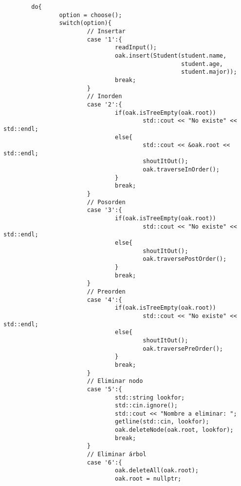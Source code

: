 \documentclass[11pt]{article}
\begin{document}
\begin{verbatim}
        do{
                option = choose();
                switch(option){
                        // Insertar
                        case '1':{
                                readInput();
                                oak.insert(Student(student.name,
                                                   student.age,
                                                   student.major));
                                break;
                        }
                        // Inorden
                        case '2':{
                                if(oak.isTreeEmpty(oak.root))
                                        std::cout << "No existe" << std::endl;
                                else{
                                        std::cout << &oak.root << std::endl;
                                        shoutItOut();
                                        oak.traverseInOrder();
                                }
                                break;
                        }
                        // Posorden
                        case '3':{
                                if(oak.isTreeEmpty(oak.root))
                                        std::cout << "No existe" << std::endl;
                                else{
                                        shoutItOut();
                                        oak.traversePostOrder();
                                }
                                break;
                        }
                        // Preorden
                        case '4':{
                                if(oak.isTreeEmpty(oak.root))
                                        std::cout << "No existe" << std::endl;
                                else{
                                        shoutItOut();
                                        oak.traversePreOrder();
                                }
                                break;
                        }
                        // Eliminar nodo
                        case '5':{
                                std::string lookfor;
                                std::cin.ignore();
                                std::cout << "Nombre a eliminar: ";
                                getline(std::cin, lookfor);
                                oak.deleteNode(oak.root, lookfor);
                                break;
                        }
                        // Eliminar árbol
                        case '6':{
                                oak.deleteAll(oak.root);
                                oak.root = nullptr;

\end{verbatim}
\end{document}
